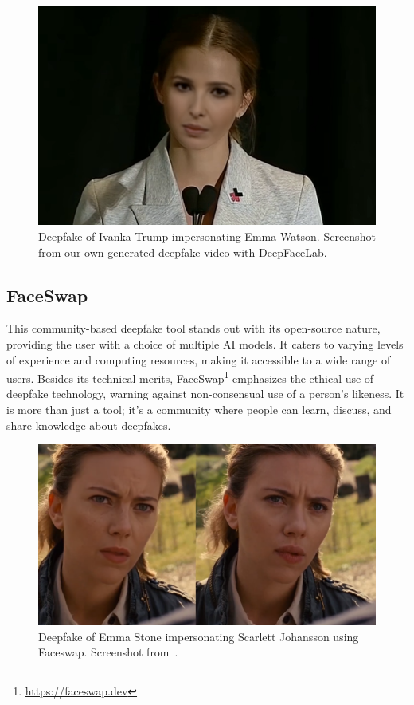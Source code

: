 \begin{figure}[hb]
	\centering
	\includegraphics[scale=0.36]{figures/ivanka-deepfacelab}
	\caption{Deepfake of Ivanka Trump impersonating Emma Watson. Screenshot
		from our own generated deepfake video with DeepFaceLab.} %
\end{figure}

\subsection{FaceSwap}
This community-based deepfake tool stands out with its open-source nature,
providing the user with a choice of multiple \ac{AI} models. It caters to
varying levels of experience and computing resources, making it accessible
to a wide range of users. Besides its technical merits,
FaceSwap\footnote{\url{https://faceswap.dev}} emphasizes the ethical use
of deepfake technology, warning against non-consensual use of a person's
likeness. It is more than just a tool; it's a community where people can
learn, discuss, and share knowledge about deepfakes.

\begin{figure}[ht]
	\centering
	\includegraphics[scale=0.32]{figures/emma-stone-faceswap}
	\caption{Deepfake of Emma Stone impersonating Scarlett Johansson using
		Faceswap. Screenshot from~\cite{emma-stone-faceswap}.}
\end{figure}

